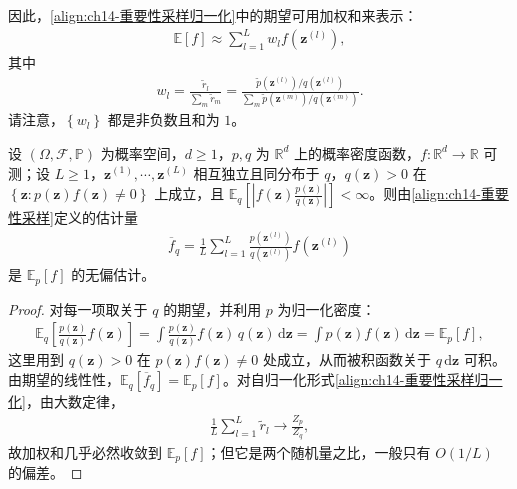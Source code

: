 \documentclass[../../main.tex]{subfiles}
\begin{document}
因此，\eqref{align:ch14-重要性采样归一化}中的期望可用加权和来表示：
\begin{align}
\mathbb{E}[f]\approx\sum_{l=1}^{L}w_{l}f\!\left(\bm{z}^{(l)}\right),
\label{align:ch14-加权和}
\end{align}
其中
\begin{align}
w_{l}=\frac{\tilde{r}_{l}}{\sum_{m}\tilde{r}_{m}}=\frac{\widetilde{p}\!\left(\bm{z}^{(l)}\right)/q\!\left(\bm{z}^{(l)}\right)}{\sum_{m}\widetilde{p}\!\left(\bm{z}^{(m)}\right)/q\!\left(\bm{z}^{(m)}\right)}.
\label{align:ch14-归一化权重}
\end{align}
请注意，$\left\{w_{l}\right\}$ 都是非负数且和为 $1$。

\begin{proposition}[重要性采样估计的无偏性]\label{proposition:ch14-重要性采样无偏}
设 $(\Omega,\mathcal{F},\mathbb{P})$ 为概率空间，$d\geqslant1$，$p,q$ 为 $\mathbb{R}^{d}$ 上的概率密度函数，$f:\mathbb{R}^{d}\to\mathbb{R}$ 可测；设 $L\geqslant1$，$\bm{z}^{(1)},\cdots,\bm{z}^{(L)}$ 相互独立且同分布于 $q$，$q(\bm{z})>0$ 在 $\left\{\bm{z}:p(\bm{z})f(\bm{z})\neq0\right\}$ 上成立，且 $\mathbb{E}_{q}\left[\left|f(\bm{z})\frac{p(\bm{z})}{q(\bm{z})}\right|\right]<\infty$。则由\eqref{align:ch14-重要性采样}定义的估计量
\begin{align*}
\overline{f}_{q}=\frac{1}{L}\sum_{l=1}^{L}\frac{p\!\left(\bm{z}^{(l)}\right)}{q\!\left(\bm{z}^{(l)}\right)}f\!\left(\bm{z}^{(l)}\right)
\end{align*}
是 $\mathbb{E}_{p}[f]$ 的无偏估计。
\end{proposition}

\begin{proof}
对每一项取关于 $q$ 的期望，并利用 $p$ 为归一化密度：
\begin{align*}
\mathbb{E}_{q}\left[\frac{p(\bm{z})}{q(\bm{z})}f(\bm{z})\right]=\int\frac{p(\bm{z})}{q(\bm{z})}f(\bm{z})\,q(\bm{z})\,\mathrm{d}\bm{z}=\int p(\bm{z})f(\bm{z})\,\mathrm{d}\bm{z}=\mathbb{E}_{p}[f],
\end{align*}
这里用到 $q(\bm{z})>0$ 在 $p(\bm{z})f(\bm{z})\neq0$ 处成立，从而被积函数关于 $q\,\mathrm{d}\bm{z}$ 可积。由期望的线性性，$\mathbb{E}_{q}\left[\overline{f}_{q}\right]=\mathbb{E}_{p}[f]$。对自归一化形式\eqref{align:ch14-重要性采样归一化}，由大数定律，
\begin{align*}
\frac{1}{L}\sum_{l=1}^{L}\tilde{r}_{l}\longrightarrow\frac{Z_{p}}{Z_{q}},
\end{align*}
故加权和几乎必然收敛到 $\mathbb{E}_{p}[f]$；但它是两个随机量之比，一般只有 $O(1/L)$ 的偏差。
\end{proof}
\end{document}
